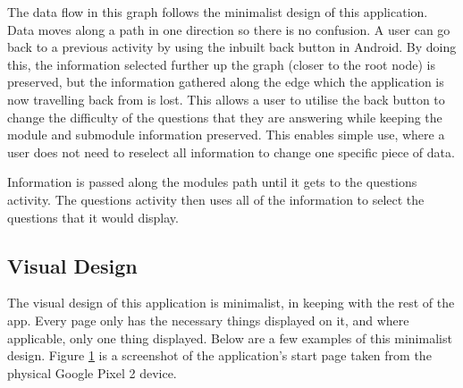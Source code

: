\documentclass{article}
\begin{document}
The data flow in this graph follows the minimalist design of this application. Data moves along a path in one direction so there is no confusion. A user can go back to a previous activity by using the inbuilt back button in Android. By doing this, the information selected further up the graph (closer to the root node) is preserved, but the information gathered along the edge which the application is now travelling back from is lost. This allows a user to utilise the back button to change the difficulty of the questions that they are answering while keeping the module and submodule information preserved. This enables simple use, where a user does not need to reselect all information to change one specific piece of data. \par

Information is passed along the modules path until it gets to the questions activity. The questions activity then uses all of the information to select the questions that it would display. \par

\subsection{Visual Design}

The visual design of this application is minimalist, in keeping with the rest of the app. Every page only has the necessary things displayed on it, and where applicable, only one thing displayed. Below are a few examples of this minimalist design. Figure \ref{figure:applicationStartPage} is a screenshot of the application's start page taken from the physical Google Pixel 2 device.

\begin{figure}[H]
	\centering
	\caption{}
	\label{figure:applicationStartPage}
\end{figure}
\end{document}
